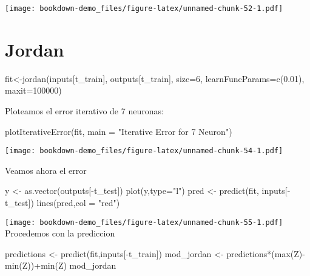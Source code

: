 \documentclass[
]{book}
\newenvironment{Shaded}{\begin{snugshade}}{\end{snugshade}}
\newcommand{\AttributeTok}[1]{\textcolor[rgb]{0.77,0.63,0.00}{#1}}
\newcommand{\DecValTok}[1]{\textcolor[rgb]{0.00,0.00,0.81}{#1}}
\newcommand{\FloatTok}[1]{\textcolor[rgb]{0.00,0.00,0.81}{#1}}
\newcommand{\FunctionTok}[1]{\textcolor[rgb]{0.00,0.00,0.00}{#1}}
\newcommand{\NormalTok}[1]{#1}
\newcommand{\OtherTok}[1]{\textcolor[rgb]{0.56,0.35,0.01}{#1}}
\newcommand{\SpecialCharTok}[1]{\textcolor[rgb]{0.00,0.00,0.00}{#1}}
\newcommand{\StringTok}[1]{\textcolor[rgb]{0.31,0.60,0.02}{#1}}
\begin{document}
\texttt{[image: bookdown-demo\_files/figure-latex/unnamed-chunk-52-1.pdf]}

\hypertarget{jordan}{%
\section{Jordan}\label{jordan}}

\begin{Shaded}
\begin{Highlighting}[]
\NormalTok{fit}\OtherTok{\textless{}{-}}\FunctionTok{jordan}\NormalTok{(inputs[t\_train],}
\NormalTok{    outputs[t\_train],}
    \AttributeTok{size=}\DecValTok{6}\NormalTok{,}
    \AttributeTok{learnFuncParams=}\FunctionTok{c}\NormalTok{(}\FloatTok{0.01}\NormalTok{),}
    \AttributeTok{maxit=}\DecValTok{100000}\NormalTok{)}
\end{Highlighting}
\end{Shaded}

Ploteamos el error iterativo de 7 neuronas:

\begin{Shaded}
\begin{Highlighting}[]
\FunctionTok{plotIterativeError}\NormalTok{(fit, }\AttributeTok{main =} \StringTok{"Iterative Error for 7 Neuron"}\NormalTok{)}
\end{Highlighting}
\end{Shaded}

\texttt{[image: bookdown-demo\_files/figure-latex/unnamed-chunk-54-1.pdf]}

Veamos ahora el error

\begin{Shaded}
\begin{Highlighting}[]
\NormalTok{y }\OtherTok{\textless{}{-}} \FunctionTok{as.vector}\NormalTok{(outputs[}\SpecialCharTok{{-}}\NormalTok{t\_test])}
\FunctionTok{plot}\NormalTok{(y,}\AttributeTok{type=}\StringTok{"l"}\NormalTok{)}
\NormalTok{pred }\OtherTok{\textless{}{-}} \FunctionTok{predict}\NormalTok{(fit, inputs[}\SpecialCharTok{{-}}\NormalTok{t\_test])}
\FunctionTok{lines}\NormalTok{(pred,}\AttributeTok{col =} \StringTok{"red"}\NormalTok{)}
\end{Highlighting}
\end{Shaded}

\texttt{[image: bookdown-demo\_files/figure-latex/unnamed-chunk-55-1.pdf]}
Procedemos con la prediccion

\begin{Shaded}
\begin{Highlighting}[]
\NormalTok{predictions }\OtherTok{\textless{}{-}} \FunctionTok{predict}\NormalTok{(fit,inputs[}\SpecialCharTok{{-}}\NormalTok{t\_train])}
\NormalTok{mod\_jordan }\OtherTok{\textless{}{-}}\NormalTok{ predictions}\SpecialCharTok{*}\NormalTok{(}\FunctionTok{max}\NormalTok{(Z)}\SpecialCharTok{{-}}\FunctionTok{min}\NormalTok{(Z))}\SpecialCharTok{+}\FunctionTok{min}\NormalTok{(Z)}
\NormalTok{mod\_jordan}
\end{Highlighting}
\end{Shaded}
\end{document}
